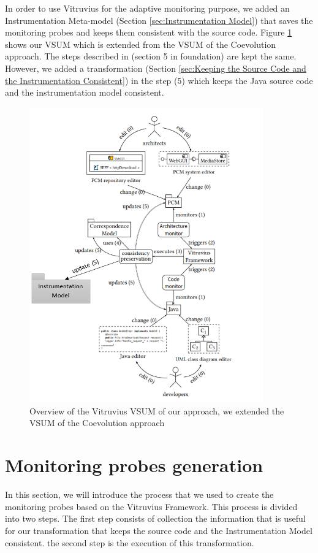 In order to use Vitruvius for the adaptive monitoring purpose, we added an Instrumentation Meta-model (Section \ref{sec:Instrumentation Model}) that saves the monitoring probes and keeps them consistent with the source code. Figure \ref{fig:extended_vsum} shows our VSUM which is extended from the VSUM of the Coevolution approach. The steps described in (section 5 in foundation) are kept the same. However, we added a transformation (Section \ref{sec:Keeping the Source Code and the Instrumentation Consistent}) in the step (5) which keeps the Java source code and the instrumentation model consistent. 

\begin{figure}[h]
\centering
\includegraphics[width=0.9\textwidth]{figures/extended_vsum}
\caption{Overview of the Vitruvius VSUM of our approach, we extended the VSUM of the Coevolution approach}
\label{fig:extended_vsum}
\end{figure}

\section{Monitoring probes generation}
\label{sec:Monitoring probes generation}
In this section, we will introduce the process that we used to create the monitoring probes based on the Vitruvius Framework. This process is divided into two steps. The first step consists of collection the information that is useful for our transformation that keeps the source code and the Instrumentation Model consistent. the second step is the execution of this transformation.

